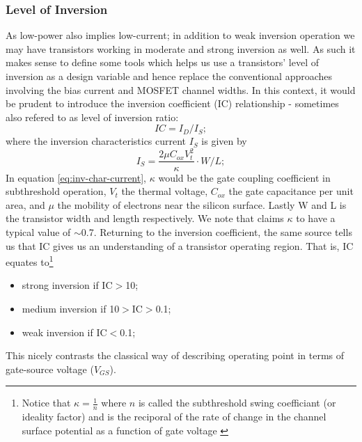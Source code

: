 	\subsubsection{Level of Inversion}\label{subsubsec:lev-of-inv}
	As low-power also implies low-current; in addition to weak inversion operation
	we may have transistors working in moderate and strong inversion as well. As such it makes sense to define some tools which helps us use a transistors' level of inversion as a design variable
	and hence replace the conventional approaches involving the bias current and MOSFET channel widths.
	In this context, it would be prudent to introduce the inversion coefficient (IC) relationship - sometimes also refered to as level of inversion ratio:
	    \begin{equation} 
	    \label{eq:IC}
	      IC=I_D/I_S;
	    \end{equation}
	where the inversion characteristics current $I_S$ is given by
	    \begin{equation} 
	    \label{eq:inv-char-current}
	      I_S= \frac{2 \mu C_{ox} V_t^2}{ \kappa } \cdot W/L;
	    \end{equation}
	In equation \ref{eq:inv-char-current}, $\kappa$ would be the gate coupling coefficient in subthreshold operation, $V_t$ the thermal voltage, $C_{ox}$ the gate capacitance per unit area, and $\mu$ the mobility of electrons near the silicon surface. Lastly W and L is the transistor width and length respectively. We note that \cite{harrison2003low} claims $\kappa$ to have a typical value of $\sim$0.7. Returning to the inversion coefficient, the same 
	source tells us that IC gives us an understanding of a transistor operating region. That is, IC equates to\footnote{Notice that $\kappa = \frac{1}{n}$ where $n$ is called the subthreshold swing coefficiant (or ideality factor) and is the reciporal of the rate of change in the channel surface potential as a function of gate voltage \cite{kursun2006multi}}
		  \begin{itemize}
    		    \item strong inversion if IC$>$10;%
    		    \item medium inversion if 10$>$IC$>$0.1; %
    		    \item weak inversion if IC$<$0.1;%
		  \end{itemize}
	This nicely contrasts the classical way of describing operating point in terms of gate-source voltage ($V_{GS}$).
